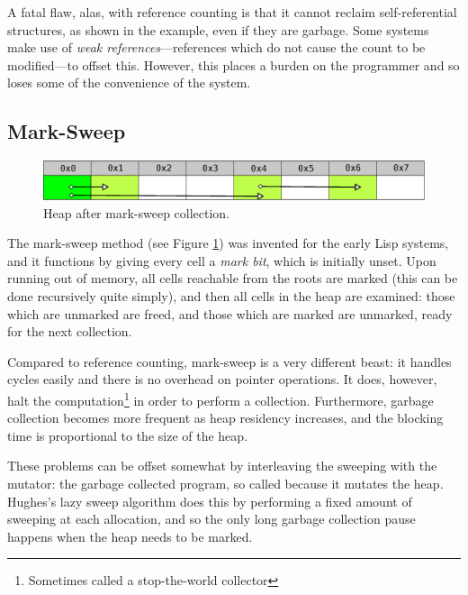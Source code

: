 A fatal flaw, alas, with reference counting is that it cannot reclaim
self-referential structures, as shown in the example, even if they are
garbage\cite{McBeth63}. Some systems make use of \textit{weak
  references}---references which do not cause the count to be
modified---to offset this\cite{Brown95}. However, this places a burden
on the programmer and so loses some of the convenience of the system.

\subsection{Mark-Sweep}
\label{sec:lit-gc-marksweep}

\begin{figure}[t]
  \centering
  \includegraphics[width=\textwidth]{lit-gc-marksweep}
  \captionsetup{format=default}
  \caption{Heap after mark-sweep collection.}
  \label{fig:lit-gc-marksweep}
\end{figure}

The mark-sweep method (see Figure \ref{fig:lit-gc-marksweep}) was
invented for the early Lisp systems\cite{McCarthy60}, and it functions
by giving every cell a \textit{mark bit}, which is initially
unset. Upon running out of memory, all cells reachable from the roots
are marked (this can be done recursively quite simply), and then all
cells in the heap are examined: those which are unmarked are freed,
and those which are marked are unmarked, ready for the next
collection\cite{GarbageCollection}.

Compared to reference counting, mark-sweep is a very different beast:
it handles cycles easily and there is no overhead on pointer
operations. It does, however, halt the computation\footnote{Sometimes
  called a stop-the-world collector} in order to perform a
collection\cite{GarbageCollection}. Furthermore, garbage collection
becomes more frequent as heap residency increases\cite{McCarthy60},
and the blocking time is proportional to the size of the
heap\cite{Appel87}.

These problems can be offset somewhat by interleaving the sweeping
with the mutator: the garbage collected program, so called because it
mutates the heap\cite{Dijkstra78}. Hughes's lazy sweep
algorithm\cite{Hughes82} does this by performing a fixed amount of
sweeping at each allocation, and so the only long garbage collection
pause happens when the heap needs to be marked.

